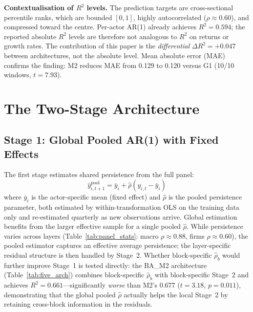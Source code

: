 \documentclass[11pt,a4paper]{article}
\begin{document}
\textbf{Contextualisation of $R^2$ levels.} The prediction targets are cross-sectional percentile ranks, which are bounded $[0,1]$, highly autocorrelated ($\rho \approx 0.60$), and compressed toward the centre. Per-actor AR(1) already achieves $R^2 = 0.594$; the reported absolute $R^2$ levels are therefore not analogous to $R^2$ on returns or growth rates. The contribution of this paper is the \emph{differential} $\Delta R^2 = +0.047$ between architectures, not the absolute level. Mean absolute error (MAE) confirms the finding: M2 reduces MAE from 0.129 to 0.120 versus G1 (10/10 windows, $t = 7.93$).

\section{The Two-Stage Architecture}
\label{sec:architecture}

\subsection{Stage 1: Global Pooled AR(1) with Fixed Effects}

The first stage estimates shared persistence from the full panel:
\begin{equation}
\hat{y}^{\mathrm{pool}}_{i,t+1} = \bar{y}_i + \hat{\rho} \left( y_{i,t} - \bar{y}_i \right)
\end{equation}
where $\bar{y}_i$ is the actor-specific mean (fixed effect) and $\hat{\rho}$ is the pooled persistence parameter, both estimated by within-transformation OLS on the training data only and re-estimated quarterly as new observations arrive. Global estimation benefits from the larger effective sample for a single pooled $\hat\rho$. While persistence varies across layers (Table~\ref{tab:panel_stats}: macro $\rho \approx 0.88$, firms $\rho \approx 0.60$), the pooled estimator captures an effective average persistence; the layer-specific residual structure is then handled by Stage~2. Whether block-specific $\hat\rho_b$ would further improve Stage~1 is tested directly: the BA\_M2 architecture (Table~\ref{tab:five_arch}) combines block-specific $\hat\rho_b$ with block-specific Stage~2 and achieves $R^2 = 0.661$---significantly \emph{worse} than M2's $0.677$ ($t = 3.18$, $p = 0.011$), demonstrating that the global pooled $\hat\rho$ actually helps the local Stage~2 by retaining cross-block information in the residuals.
\end{document}
